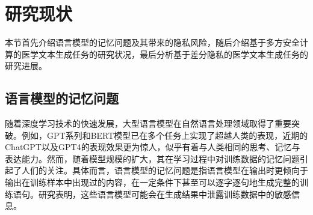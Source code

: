 %
%
%


\section{研究现状}

本节首先介绍语言模型的记忆问题及其带来的隐私风险，随后介绍基于多方安全计算的医学文本生成任务的研究状况，最后分析基于差分隐私的医学文本生成任务的研究进展。

\subsection{语言模型的记忆问题}

随着深度学习技术的快速发展，大型语言模型在自然语言处理领域取得了重要突破。例如，GPT\cite{GPT2, GPT3, InstructGPT, GPT4}系列和BERT\cite{BERT}模型已在多个任务上实现了超越人类的表现，近期的ChatGPT\cite{InstructGPT}以及GPT4\cite{GPT4}的表现效果更为惊人，似乎有着与人类相同的思考、记忆与表达能力。然而，随着模型规模的扩大，其在学习过程中对训练数据的记忆问题引起了人们的关注。具体而言，语言模型的记忆问题是指语言模型在输出时更倾向于输出在训练样本中出现过的内容，在一定条件下甚至可以逐字逐句地生成完整的训练语句。研究表明，这些语言模型可能会在生成结果中泄露训练数据中的敏感信息。

